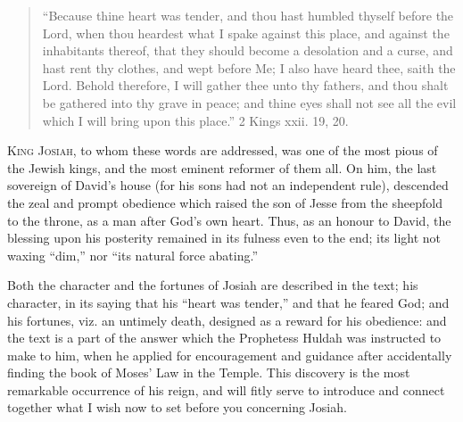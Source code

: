 
\begin{quote}

``Because thine heart was tender, and thou hast humbled
thyself before the Lord, when thou heardest what I spake against
this place, and against the inhabitants thereof, that they should
become a desolation and a curse, and hast rent thy clothes, and wept
before Me; I also have heard thee, saith the Lord. Behold therefore,
I will gather thee unto thy fathers, and thou shalt be gathered into
thy grave in peace; and thine eyes shall not see all the evil which
I will bring upon this place.'' 2 Kings xxii. 19, 20.

\end{quote}

K\textsc{ing} J\textsc{osiah}, to whom these words are addressed, was one of the most
pious of the Jewish kings, and the most eminent reformer of them all.
On him, the last sovereign of David's house (for his sons had not an
independent rule), descended the zeal and prompt obedience which
raised the son of Jesse from the sheepfold to the throne, as a man
after God's own heart. Thus, as an honour to David, the blessing upon
his posterity remained in its fulness even to the end; its light not
waxing ``dim,'' nor ``its natural force abating.''

Both the character and the fortunes of Josiah are described in the
text; his character, in its saying that his ``heart was
tender,'' and that he feared God; and his fortunes, viz. an
untimely death, designed as a reward for his obedience: and the text
is a part of the answer which the Prophetess Huldah was instructed to
make to him, when he applied for encouragement and guidance after
accidentally finding the book of Moses' Law in the Temple. This
discovery is the most remarkable occurrence of his reign, and will
fitly serve to introduce and connect together what I wish now to set
before you concerning Josiah.

